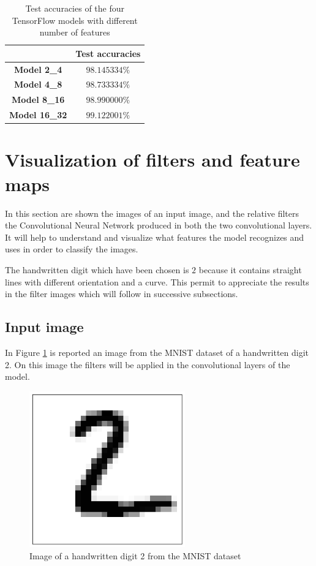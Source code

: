 \begin{table}
	\centering
	\begin{tabular}{cc}
		\hline
		& \textbf{Test accuracies} \\
		\hline
		\textbf{Model 2\_4} & $98.145334 \%$ \\
		\textbf{Model 4\_8} & $98.733334 \%$ \\
		\textbf{Model 8\_16} & $98.990000 \%$ \\
		\textbf{Model 16\_32} & $99.122001 \%$ \\
		\hline
	\end{tabular}
	\caption{Test accuracies of the four TensorFlow models with different number of features}
	\label{tab:test_accuracies}
\end{table}

\section{Visualization of filters and feature maps}

In this section are shown the images of an input image, and the relative filters the Convolutional Neural Network produced in both the two convolutional layers. It will help to understand and visualize what features the model recognizes and uses in order to classify the images.

The handwritten digit which have been chosen is $2$ because it contains straight lines with different orientation and a curve. This permit to appreciate the results in the filter images which will follow in successive subsections. 

\subsection{Input image}

In Figure \ref{fig:digit_2} is reported an image from the MNIST dataset of a handwritten digit 2. On this image the filters will be applied in the convolutional layers of the model.

\begin{figure}
	\centering
	\includegraphics[width=0.6\textwidth]{Images/digit_2}
	\caption{Image of a handwritten digit 2 from the MNIST dataset}
	\label{fig:digit_2}
\end{figure}

